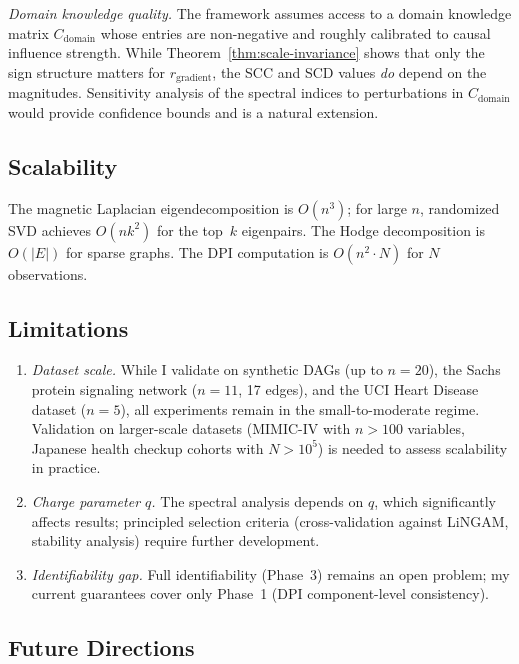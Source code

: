 \documentclass[twoside,11pt]{article}
\begin{document}
\emph{Domain knowledge quality.}  The framework assumes access to a
domain knowledge matrix $C_{\mathrm{domain}}$ whose entries are
non-negative and roughly calibrated to causal influence strength.
While Theorem~\ref{thm:scale-invariance} shows that only the sign
structure matters for $r_{\mathrm{gradient}}$, the SCC and SCD values
\emph{do} depend on the magnitudes.  Sensitivity analysis of the
spectral indices to perturbations in $C_{\mathrm{domain}}$ would
provide confidence bounds and is a natural extension.

\subsection{Scalability}

The magnetic Laplacian eigendecomposition is $O(n^3)$; for large $n$,
randomized SVD achieves $O(nk^2)$ for the top~$k$ eigenpairs.  The
Hodge decomposition is $O(|E|)$ for sparse graphs.  The DPI computation
is $O(n^2\cdot N)$ for $N$ observations.

\subsection{Limitations}

\begin{enumerate}
\item \emph{Dataset scale.}  While I validate on synthetic DAGs (up to
  $n=20$), the Sachs protein signaling network ($n=11$, 17 edges), and
  the UCI Heart Disease dataset ($n=5$), all experiments remain in the
  small-to-moderate regime.  Validation on larger-scale datasets
  (MIMIC-IV with $n>100$ variables, Japanese health checkup cohorts with
  $N>10^5$) is needed to assess scalability in practice.
\item \emph{Charge parameter $q$.}  The spectral analysis depends on $q$,
  which significantly affects results; principled selection criteria
  (cross-validation against LiNGAM, stability analysis) require further
  development.
\item \emph{Identifiability gap.}  Full identifiability (Phase~3) remains
  an open problem; my current guarantees cover only Phase~1 (DPI
  component-level consistency).
\end{enumerate}

\subsection{Future Directions}
\end{document}
